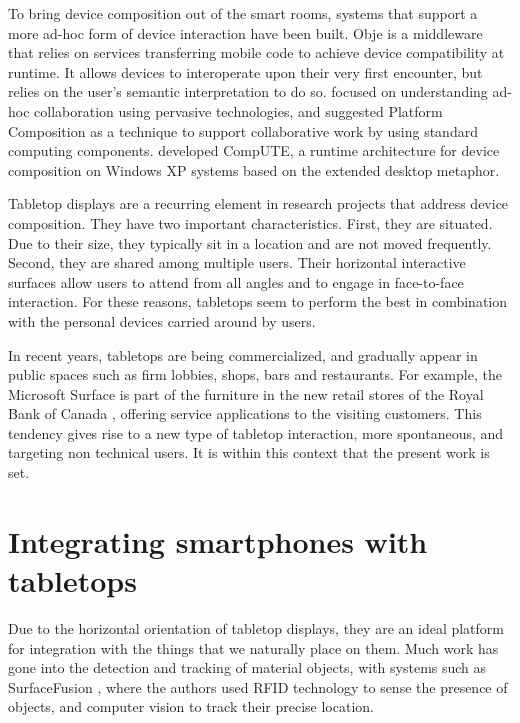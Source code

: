 To bring device composition out of the smart rooms, systems that support a more ad-hoc form of device interaction have been built.
Obje \citep{Edwards:2009:obje} is a middleware that relies on services transferring mobile code to achieve device compatibility at runtime.
It allows devices to interoperate upon their very first encounter, but relies on the user's semantic interpretation to do so.
\cite{Pering:2009:platformcomp} focused on understanding ad-hoc collaboration using pervasive technologies, and suggested Platform Composition as a technique to support collaborative work by using standard computing components.
\cite{Bardram:2010:compute} developed CompUTE, a runtime architecture for device composition on Windows XP systems based on the extended desktop metaphor.

Tabletop displays are a recurring element in research projects that address device composition.
They have two important characteristics.
First, they are situated.
Due to their size, they typically sit in a location and are not moved frequently.
Second, they are shared among multiple users.
Their horizontal interactive surfaces allow users to attend from all angles and to engage in face-to-face interaction.
For these reasons, tabletops seem to perform the best in combination with the personal devices carried around by users.

In recent years, tabletops are being commercialized, and gradually appear in public spaces such as firm lobbies, shops, bars and restaurants.
For example, the Microsoft Surface is part of the furniture in the new retail stores of the Royal Bank of Canada \citep{mscase}, offering service applications to the visiting customers.
This tendency gives rise to a new type of tabletop interaction, more spontaneous, and targeting non technical users.
It is within this context that the present work is set.

\section{Integrating smartphones with tabletops}
\label{sec:rwintegration}

Due to the horizontal orientation of tabletop displays, they are an ideal platform for integration with the things that we naturally place on them.
Much work has gone into the detection and tracking of material objects, with systems such as SurfaceFusion \citep{Olwal:2008:surfacefusion}, where the authors used RFID technology to sense the presence of objects, and computer vision to track their precise location.

